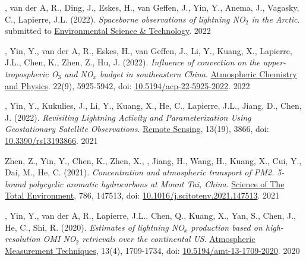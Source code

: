 \vspace{0.5em}

\begin{cvpublications}

\publication
{, van der A, R., Ding, J., Eskes, H., van Geffen, J.,
Yin, Y., Anema, J., Vagasky, C., Lapierre, J.L. (2022).
\emph{Spaceborne observations of lightning NO$_2$ in the Arctic}.
submitted to \underline{Environmental Science \& Technology}.} %
{2022} %

\publication
{, Yin, Y., van der A, R., Eskes, H., van Geffen, J.,
Li, Y., Kuang, X., Lapierre, J.L., Chen, K., Zhen, Z., Hu, J. (2022).
\emph{Influence of convection on the upper-tropospheric O$_3$ and NO$_x$ budget in southeastern China}.
\underline{Atmospheric Chemistry and Physics}.
22(9), 5925-5942, doi: \href{https://doi.org/10.5194/acp-22-5925-2022}{10.5194/acp-22-5925-2022}.} %
{2022} %

\publication
{, Yin, Y., Kukulies, J., Li, Y., Kuang, X.,
He, C., Lapierre, J.L., Jiang, D., Chen, J. (2022).
\emph{Revisiting Lightning Activity and Parameterization Using
Geostationary Satellite Observations}.
\underline{Remote Sensing}, 13(19), 3866,
doi: \href{https://doi.org/10.3390/rs13193866}{10.3390/rs13193866}.} %
{2021} %

\publication
{Zhen, Z., Yin, Y., Chen, K., Zhen, X., ,
Jiang, H., Wang, H., Kuang, X., Cui, Y., Dai, M., He, C. (2021).
\emph{Concentration and atmospheric transport of PM2. 5-bound polycyclic aromatic hydrocarbons at Mount Tai, China}.
\underline{Science of The Total Environment}, 786, 147513,
doi: \href{https://doi.org/10.1016/j.scitotenv.2021.147513}{10.1016/j.scitotenv.2021.147513}.} %
{2021} %

\publication
{, Yin, Y., van der A, R., Lapierre, J.L.,
Chen, Q., Kuang, X., Yan, S., Chen, J., He, C., Shi, R. (2020).
\emph{Estimates of lightning NO$_x$ production based on high-resolution OMI NO$_2$ retrievals over the continental US}.
\underline{Atmospheric Measurement Techniques}, 13(4), 1709-1734,
doi: \href{https://doi.org/10.5194/amt-13-1709-2020}{10.5194/amt-13-1709-2020}.} %
{2020} %


\end{cvpublications}
